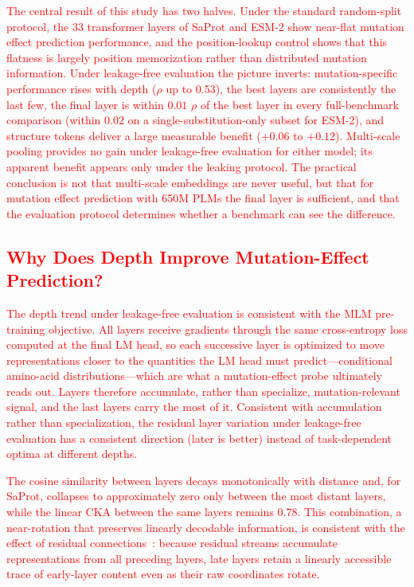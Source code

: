 \documentclass[11pt,a4paper]{article}
\newcommand{\rev}[1]{\textcolor{red}{#1}}
\begin{document}
\textcolor{red}{\rev{The central result of this study has two halves. Under the standard
random-split protocol, the 33 transformer layers of SaProt and ESM-2 show
near-flat mutation effect prediction performance, and the position-lookup
control shows that this flatness is largely position memorization rather than
distributed mutation information. Under leakage-free evaluation the picture
inverts: mutation-specific performance rises with depth ($\rho$ up to 0.53),
the best layers are consistently the last few, the final layer is within
$0.01$ $\rho$ of the best layer in every full-benchmark comparison (within
$0.02$ on a single-substitution-only subset for ESM-2), and structure
tokens deliver a large measurable benefit ($+0.06$ to $+0.12$). Multi-scale
pooling provides no gain under leakage-free evaluation for either model; its
apparent benefit appears only under the leaking protocol. The practical
conclusion is not that multi-scale embeddings are never useful, but that for
mutation effect prediction with 650M PLMs the final layer is sufficient, and
that the evaluation protocol determines whether a benchmark can see the
difference.}}

\textcolor{red}{\subsection{\rev{Why Does Depth Improve Mutation-Effect Prediction?}}}

\textcolor{red}{\rev{The depth trend under leakage-free evaluation is consistent with the MLM
pre-training objective. All layers receive gradients through the same
cross-entropy loss computed at the final LM head, so each successive layer is
optimized to move representations closer to the quantities the LM head must
predict---conditional amino-acid distributions---which are what a
mutation-effect probe ultimately reads out. Layers therefore accumulate,
rather than specialize, mutation-relevant signal, and the last layers carry
the most of it. Consistent with accumulation rather than specialization, the
residual layer variation under leakage-free evaluation has a consistent
direction (later is better) instead of task-dependent optima at different
depths.}}

\textcolor{red}{\rev{The cosine similarity between layers decays monotonically with distance and,
for SaProt, collapses to approximately zero only between the most distant layers,
while the linear CKA between the same layers remains 0.78. This combination, a
near-rotation that preserves linearly decodable information, is consistent with the
effect of residual connections~\cite{he2016deep}: because residual streams accumulate
representations from all preceding layers, late layers retain a linearly accessible
trace of early-layer content even as their raw coordinates rotate.}}
\end{document}
